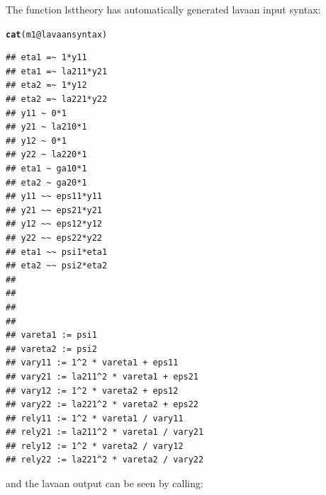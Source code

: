 \documentclass[10pt]{article}\usepackage[]{graphicx}\usepackage[]{xcolor}
\makeatletter
\newcommand{\hlopt}[1]{\textcolor[rgb]{0,0,0}{#1}}%
\newcommand{\hlstd}[1]{\textcolor[rgb]{0.345,0.345,0.345}{#1}}%
\newcommand{\hlkwc}[1]{\textcolor[rgb]{0.333,0.667,0.333}{#1}}%
\newcommand{\hlkwd}[1]{\textcolor[rgb]{0.737,0.353,0.396}{\textbf{#1}}}%
\newenvironment{kframe}{%
 \def\at@end@of@kframe{}%
 \ifinner\ifhmode%
  \def\at@end@of@kframe{\end{minipage}}%
  \begin{minipage}{\columnwidth}%
 \fi\fi%
 \def\FrameCommand##1{\hskip\@totalleftmargin \hskip-\fboxsep
 \colorbox{shadecolor}{##1}\hskip-\fboxsep
     \hskip-\linewidth \hskip-\@totalleftmargin \hskip\columnwidth}%
 \MakeFramed {\advance\hsize-\width
   \@totalleftmargin\z@ \linewidth\hsize
   \@setminipage}}%
 {\par\unskip\endMakeFramed%
 \at@end@of@kframe}
\newenvironment{knitrout}{}{} %
\makeatother
\begin{document}
The function lsttheory has automatically generated lavaan input syntax:
%
\begin{knitrout}
\color{fgcolor}\begin{kframe}
\begin{alltt}
\hlkwd{cat}\hlstd{(m1}\hlopt{@}\hlkwc{lavaansyntax}\hlstd{)}
\end{alltt}
\begin{verbatim}
## eta1 =~ 1*y11
## eta1 =~ la211*y21
## eta2 =~ 1*y12
## eta2 =~ la221*y22
## y11 ~ 0*1
## y21 ~ la210*1
## y12 ~ 0*1
## y22 ~ la220*1
## eta1 ~ ga10*1
## eta2 ~ ga20*1
## y11 ~~ eps11*y11
## y21 ~~ eps21*y21
## y12 ~~ eps12*y12
## y22 ~~ eps22*y22
## eta1 ~~ psi1*eta1
## eta2 ~~ psi2*eta2
## 
## 
## 
## 
## vareta1 := psi1
## vareta2 := psi2
## vary11 := 1^2 * vareta1 + eps11
## vary21 := la211^2 * vareta1 + eps21
## vary12 := 1^2 * vareta2 + eps12
## vary22 := la221^2 * vareta2 + eps22
## rely11 := 1^2 * vareta1 / vary11
## rely21 := la211^2 * vareta1 / vary21
## rely12 := 1^2 * vareta2 / vary12
## rely22 := la221^2 * vareta2 / vary22
\end{verbatim}
\end{kframe}
\end{knitrout}
%
and the lavaan output can be seen by calling:
%
\end{document}
